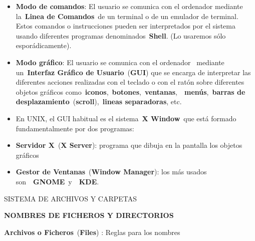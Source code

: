 \documentclass[
  jou,
  floatsintext,
  longtable,
  a4paper,
  nolmodern,
  notxfonts,
  notimes,
  12pt,
  colorlinks=true,linkcolor=blue,citecolor=blue,urlcolor=blue]{apa7}
\begin{document}
\begin{itemize}
\item
  \textbf{Modo de comandos}: El usuario se comunica con el ordenador
  mediante la~\textbf{Linea de Comandos}~de un terminal o de un emulador
  de terminal. Estos comandos o instrucciones pueden ser interpretados
  por el sistema usando diferentes programas denominados~\textbf{Shell}.
  (Lo usaremos sólo esporádicamente).
\item
  \textbf{Modo gráfico}: El usuario se comunica con el ordenador~
  mediante un~\textbf{Interfaz Gráfico de Usuario}~(\textbf{GUI}) que se
  encarga de interpretar las diferentes acciones realizadas con el
  teclado o con el ratón sobre diferentes objetos gráficos
  como~\textbf{iconos},~\textbf{botones},~\textbf{ventanas},~~\textbf{menús},~\textbf{barras
  de desplazamiento}~(\textbf{scroll}),~\textbf{lineas separadoras},
  etc.
\item
  En UNIX, el GUI habitual es el sistema~\textbf{X Window}~que está
  formado fundamentalmente por dos programas:
\item
  \textbf{Servidor X}~(\textbf{X Server}): programa que dibuja en la
  pantalla los objetos gráficos
\item
  \textbf{Gestor de Ventanas}~(\textbf{Window Manager}): los más usados
  son~~\textbf{GNOME}~y~~\textbf{KDE}.
\end{itemize}

SISTEMA DE ARCHIVOS Y CARPETAS

\textbf{NOMBRES DE FICHEROS Y DIRECTORIOS}

\textbf{Archivos o Ficheros}~(\textbf{Files}) : Reglas para los nombres
\end{document}
